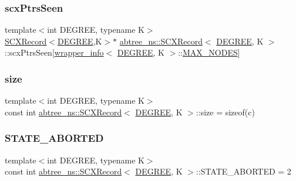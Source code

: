 \subsubsection{\texorpdfstring{scx\+Ptrs\+Seen}{scxPtrsSeen}}
{\footnotesize\ttfamily template$<$int D\+E\+G\+R\+EE, typename K$>$ \\
\hyperlink{structabtree__ns_1_1SCXRecord}{S\+C\+X\+Record}$<$\hyperlink{brown__sigouin__abtree__kcas_2adapter_8h_a5d88b17d70c985f2f2b8e987037fd6dd}{D\+E\+G\+R\+EE},K$>$$\ast$ \hyperlink{structabtree__ns_1_1SCXRecord}{abtree\+\_\+ns\+::\+S\+C\+X\+Record}$<$ \hyperlink{brown__sigouin__abtree__kcas_2adapter_8h_a5d88b17d70c985f2f2b8e987037fd6dd}{D\+E\+G\+R\+EE}, K $>$\+::scx\+Ptrs\+Seen\mbox{[}\hyperlink{classabtree__ns_1_1wrapper__info}{wrapper\+\_\+info}$<$ \hyperlink{brown__sigouin__abtree__kcas_2adapter_8h_a5d88b17d70c985f2f2b8e987037fd6dd}{D\+E\+G\+R\+EE}, K $>$\+::\hyperlink{scxrecord_8h_abd2aacdca9cb2a1a30f3392256b96ea3}{M\+A\+X\+\_\+\+N\+O\+D\+ES}\mbox{]}}

\mbox{\label{structabtree__ns_1_1SCXRecord_afbda1dbb6ba9982a911014053e34362f}} 
\subsubsection{\texorpdfstring{size}{size}}
{\footnotesize\ttfamily template$<$int D\+E\+G\+R\+EE, typename K$>$ \\
const int \hyperlink{structabtree__ns_1_1SCXRecord}{abtree\+\_\+ns\+::\+S\+C\+X\+Record}$<$ \hyperlink{brown__sigouin__abtree__kcas_2adapter_8h_a5d88b17d70c985f2f2b8e987037fd6dd}{D\+E\+G\+R\+EE}, K $>$\+::size = sizeof(c)\hspace{0.3cm}{\ttfamily [static]}}

\mbox{\label{structabtree__ns_1_1SCXRecord_a853e35695f909947c9a0015f1d801cad}} 
\subsubsection{\texorpdfstring{S\+T\+A\+T\+E\+\_\+\+A\+B\+O\+R\+T\+ED}{STATE\_ABORTED}}
{\footnotesize\ttfamily template$<$int D\+E\+G\+R\+EE, typename K$>$ \\
const int \hyperlink{structabtree__ns_1_1SCXRecord}{abtree\+\_\+ns\+::\+S\+C\+X\+Record}$<$ \hyperlink{brown__sigouin__abtree__kcas_2adapter_8h_a5d88b17d70c985f2f2b8e987037fd6dd}{D\+E\+G\+R\+EE}, K $>$\+::S\+T\+A\+T\+E\+\_\+\+A\+B\+O\+R\+T\+ED = 2\hspace{0.3cm}{\ttfamily [static]}}

